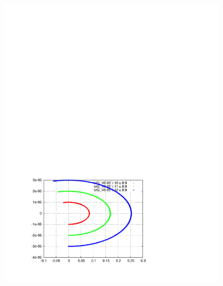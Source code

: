 \documentclass[]{article}
\begin{document}
\begin{figure}[h]
\begin{minipage}[b]{0.45\linewidth}
\includegraphics[scale=0.6]{pdf/delta_vs_ct_V0p05.pdf}
\end{minipage}
%
\hskip 1.5cm
%
\begin{minipage}[b]{0.45\linewidth}
\centering

\end{minipage}
\end{figure}
\end{document}
